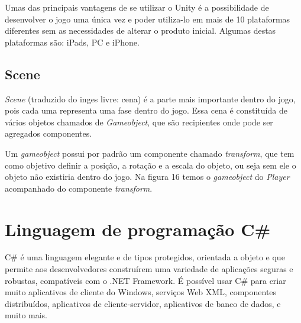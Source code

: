 Umas das principais vantagens de se utilizar o Unity é a possibilidade de desenvolver o jogo uma única vez e poder utiliza-lo em mais de 10 plataformas diferentes sem as necessidades de alterar o produto inicial. 
Algumas destas plataformas são: iPads, PC e iPhone. \cite{unt}

\subsection {Scene}

\textit{Scene} (traduzido do inges livre: cena) é a parte mais importante dentro do jogo, pois cada uma representa uma fase dentro do jogo. Essa cena é constituída de vários objetos chamados de \textit{Gameobject}, que são recipientes onde pode ser agregados componentes.

Um \textit{gameobject} possui por padrão um componente chamado \textit{transform}, que tem como objetivo definir a posição, a rotação e a escala do objeto, ou seja sem ele o objeto não existiria dentro do jogo.
Na figura 16 temos o \textit {gameobject} do \textit {Player} acompanhado do componente \textit {transform}. \cite{unt}

\begin{figure}[h!]
		\centering
	\end{figure}


\section{Linguagem de programação C\#}
\label{sec:Linguagem-de-programação-Csharp}

C\# é uma linguagem elegante e de tipos protegidos, orientada a objeto e que permite aos desenvolvedores construírem uma variedade de aplicações seguras e robustas, compatíveis com o .NET Framework. É possível usar C\# para criar muito aplicativos de cliente do Windows, serviços Web XML, componentes distribuídos, aplicativos de cliente-servidor, aplicativos de banco de dados, e muito mais. 


